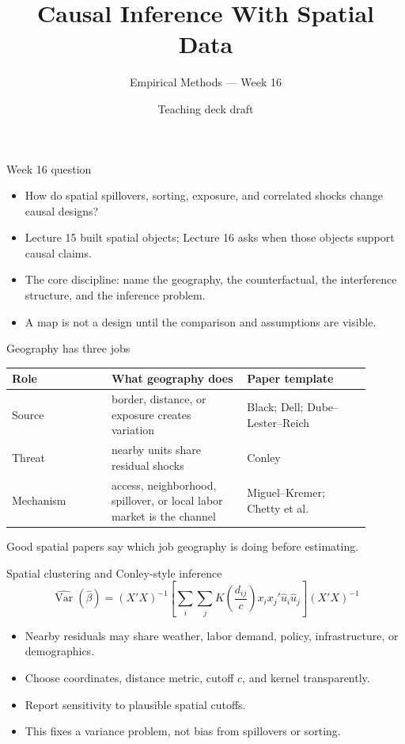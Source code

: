 \documentclass[aspectratio=169,11pt]{beamer}
\title{Causal Inference With Spatial Data}
\subtitle{Empirical Methods --- Week 16}
\author{Teaching deck draft}
\date{}
\newcommand{\1}{\mathbf{1}}
\newcommand{\Var}{\operatorname{Var}}
\begin{document}
\begin{frame}
  \titlepage
\end{frame}

\begin{frame}{Week 16 question}
\begin{itemize}
    \item How do spatial spillovers, sorting, exposure, and correlated shocks change causal designs?
    \item Lecture 15 built spatial objects; Lecture 16 asks when those objects support causal claims.
    \item The core discipline: name the geography, the counterfactual, the interference structure, and the inference problem.
    \item A map is not a design until the comparison and assumptions are visible.
\end{itemize}
\end{frame}

\begin{frame}{Geography has three jobs}
\small
\begin{tabular}{p{0.25\linewidth} p{0.34\linewidth} p{0.31\linewidth}}
\toprule
Role & What geography does & Paper template \\
\midrule
Source & border, distance, or exposure creates variation & Black; Dell; Dube--Lester--Reich \\
Threat & nearby units share residual shocks & Conley \\
Mechanism & access, neighborhood, spillover, or local labor market is the channel & Miguel--Kremer; Chetty et al. \\
\bottomrule
\end{tabular}

\medskip
Good spatial papers say which job geography is doing before estimating.
\end{frame}

\begin{frame}{Spatial clustering and Conley-style inference}
\small
\[
\widehat{\Var}(\hat\beta)
=
(X'X)^{-1}
\left[
\sum_i \sum_j K\!\left(\frac{d_{ij}}{c}\right)
x_i x_j' \hat u_i \hat u_j
\right]
(X'X)^{-1}
\]

\begin{itemize}
    \item Nearby residuals may share weather, labor demand, policy, infrastructure, or demographics.
    \item Choose coordinates, distance metric, cutoff \(c\), and kernel transparently.
    \item Report sensitivity to plausible spatial cutoffs.
    \item This fixes a variance problem, not bias from spillovers or sorting.
\end{itemize}
\end{frame}
\end{document}
